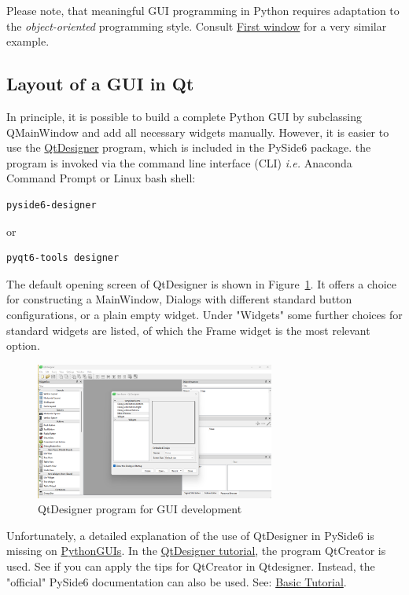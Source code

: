 Please note, that meaningful GUI programming in Python requires adaptation to the \emph{object-oriented} programming style. Consult \href{https://www.pythonguis.com/tutorials/pyside6-creating-your-first-window/}{First window} for a very similar example.

\subsection{Layout of a GUI in Qt}

In principle, it is possible to build a complete Python GUI by subclassing QMainWindow and add all necessary widgets manually. However, it is easier to use the 
\href{https://www.pythonguis.com/installation/install-qt-designer-standalone/}{QtDesigner} program, which is included in the \textsf{PySide6} package. the program is invoked via the command line interface (CLI) \emph{i.e.} Anaconda Command Prompt or Linux bash shell:

\begin{lstlisting}[style=DOS]
	pyside6-designer
\end{lstlisting}
or
\begin{lstlisting}[style=DOS]
	pyqt6-tools designer
\end{lstlisting}

The default opening screen of QtDesigner is shown in Figure~\ref{fig:qtdesigner}. It offers a choice for constructing a MainWindow, Dialogs with different standard button configurations, or a plain empty widget. Under "Widgets" some further choices for standard widgets are listed, of which the Frame widget is the most relevant option.

\begin{figure}[ht]
	\centering
	\includegraphics[width=0.7\textwidth]{Figures/QtDesigner.png}
	\caption{QtDesigner program for GUI development}
	\label{fig:qtdesigner}
\end{figure}
Unfortunately, a detailed explanation of the use of QtDesigner in PySide6 is missing on \href{https://www.pythonguis.com/}{PythonGUIs}.  In the \href{https://www.pythonguis.com/tutorials/pyside6-first-steps-qt-designer/}{QtDesigner tutorial}, the program QtCreator is used. See if you can apply the tips for QtCreator in Qtdesigner. Instead, the "official" PySide6 documentation can also be used. See:
\href{https://doc.qt.io/qtforpython-6/tutorials/basictutorial/uifiles.html}{Basic Tutorial}.

